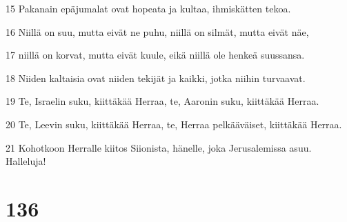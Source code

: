 \par 15 Pakanain epäjumalat ovat hopeata ja kultaa, ihmiskätten tekoa.
\par 16 Niillä on suu, mutta eivät ne puhu, niillä on silmät, mutta eivät näe,
\par 17 niillä on korvat, mutta eivät kuule, eikä niillä ole henkeä suussansa.
\par 18 Niiden kaltaisia ovat niiden tekijät ja kaikki, jotka niihin turvaavat.
\par 19 Te, Israelin suku, kiittäkää Herraa, te, Aaronin suku, kiittäkää Herraa.
\par 20 Te, Leevin suku, kiittäkää Herraa, te, Herraa pelkääväiset, kiittäkää Herraa.
\par 21 Kohotkoon Herralle kiitos Siionista, hänelle, joka Jerusalemissa asuu. Halleluja!

\chapter{136}

